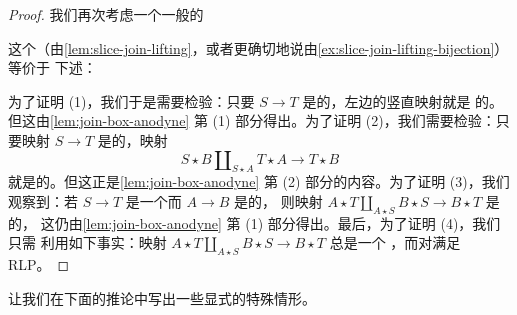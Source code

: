 \begin{proof}
我们再次考虑一个一般的\trLiftingProblem{}%
\begin{center}
\end{center}
这个\trLiftingProblem{}（由\cref{lem:slice-join-lifting}，或者更确切地说由\cref{ex:slice-join-lifting-bijection}）等价于
下述\trLiftingProblem{}：
\begin{center}
\end{center}
为了证明 (1)，我们于是需要检验：只要 $S \to T$ 是\trLeftAnodyne{}的，左边的竖直映射就是%
\trInnerAnodyne{}的。但这由\cref{lem:join-box-anodyne} 第 (1) 部分得出。为了证明
(2)，我们需要检验：只要映射 $S \to T$ 是\trLeftAnodyne{}的，映射
\[
S \star B \amalg_{S \star A} T \star A \to T \star B
\]
就是\trLeftAnodyne{}的。但这正是\cref{lem:join-box-anodyne} 第 (2) 部分的内容。为了证明
(3)，我们观察到：若 $S \to T$ 是一个\trMonomorphism{}而 $A \to B$ 是\trRightAnodyne{}的，
则映射 $A \star T \amalg_{A \star S} B \star S \to B \star T$ 是\trInnerAnodyne{}的，
这仍由\cref{lem:join-box-anodyne} 第 (1) 部分得出。最后，为了证明 (4)，我们只需
利用如下事实：映射 $A \star T \amalg_{A \star S} B \star S \to B \star T$ 总是一个%
\trMonomorphism{}，而\trTrivialFibration{}对\trMonomorphism{}满足 RLP。
\end{proof}

让我们在下面的推论中写出一些显式的特殊情形。

